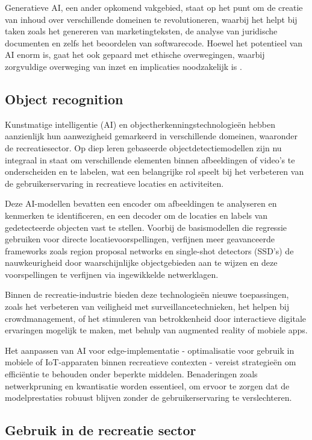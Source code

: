 Generatieve AI, een ander opkomend vakgebied, staat op het punt om de creatie van inhoud over verschillende domeinen te revolutioneren, waarbij het helpt bij taken zoals het genereren van marketingteksten, de analyse van juridische documenten en zelfs het beoordelen van softwarecode. Hoewel het potentieel van AI enorm is, gaat het ook gepaard met ethische overwegingen, waarbij zorgvuldige overweging van inzet en implicaties noodzakelijk is \autocite{mckinseyAI}.
\subsection{Object recognition}
Kunstmatige intelligentie (AI) en objectherkenningstechnologieën hebben aanzienlijk hun aanwezigheid gemarkeerd in verschillende domeinen, waaronder de recreatiesector. Op diep leren gebaseerde objectdetectiemodellen zijn nu integraal in staat om verschillende elementen binnen afbeeldingen of video's te onderscheiden en te labelen, wat een belangrijke rol speelt bij het verbeteren van de gebruikerservaring in recreatieve locaties en activiteiten.

Deze AI-modellen bevatten een encoder om afbeeldingen te analyseren en kenmerken te identificeren, en een decoder om de locaties en labels van gedetecteerde objecten vast te stellen. Voorbij de basismodellen die regressie gebruiken voor directe locatievoorspellingen, verfijnen meer geavanceerde frameworks zoals region proposal networks en single-shot detectors (SSD's) de nauwkeurigheid door waarschijnlijke objectgebieden aan te wijzen en deze voorspellingen te verfijnen via ingewikkelde netwerklagen.

Binnen de recreatie-industrie bieden deze technologieën nieuwe toepassingen, zoals het verbeteren van veiligheid met surveillancetechnieken, het helpen bij crowdmanagement, of het stimuleren van betrokkenheid door interactieve digitale ervaringen mogelijk te maken, met behulp van augmented reality of mobiele apps.

Het aanpassen van AI voor edge-implementatie - optimalisatie voor gebruik in mobiele of IoT-apparaten binnen recreatieve contexten - vereist strategieën om efficiëntie te behouden onder beperkte middelen. Benaderingen zoals netwerkpruning en kwantisatie worden essentieel, om ervoor te zorgen dat de modelprestaties robuust blijven zonder de gebruikerservaring te verslechteren.



\subsection{Gebruik in de recreatie sector}

